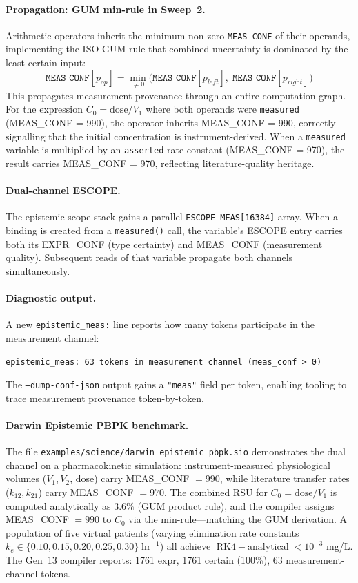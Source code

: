 \documentclass[acmsmall,screen,review,anonymous]{acmart}
\begin{document}
\paragraph{Propagation: GUM min-rule in Sweep~2.}
Arithmetic operators inherit the minimum non-zero \texttt{MEAS\_CONF} of their
operands, implementing the ISO GUM rule that combined uncertainty is dominated
by the least-certain input:
\[
  \texttt{MEAS\_CONF}[p_{\textit{op}}] =
    \min_{\neq 0}\!\bigl(\texttt{MEAS\_CONF}[p_{\textit{left}}],\;
                          \texttt{MEAS\_CONF}[p_{\textit{right}}]\bigr)
\]
This propagates measurement provenance through an entire computation graph.
For the expression $C_0 = \text{dose} / V_1$ where both operands were
\texttt{measured} (MEAS\_CONF = 990), the operator inherits MEAS\_CONF = 990,
correctly signalling that the initial concentration is instrument-derived.
When a \texttt{measured} variable is multiplied by an \texttt{asserted}
rate constant (MEAS\_CONF = 970), the result carries MEAS\_CONF = 970,
reflecting literature-quality heritage.

\paragraph{Dual-channel ESCOPE.}
The epistemic scope stack gains a parallel \texttt{ESCOPE\_MEAS[16384]} array.
When a binding is created from a \texttt{measured()} call, the variable's
ESCOPE entry carries both its EXPR\_CONF (type certainty) and MEAS\_CONF
(measurement quality).
Subsequent reads of that variable propagate both channels simultaneously.

\paragraph{Diagnostic output.}
A new \texttt{epistemic\_meas:} line reports how many tokens participate
in the measurement channel:
\begin{verbatim}
epistemic_meas: 63 tokens in measurement channel (meas_conf > 0)
\end{verbatim}
The \texttt{--dump-conf-json} output gains a \texttt{"meas"} field per token,
enabling tooling to trace measurement provenance token-by-token.

\paragraph{Darwin Epistemic PBPK benchmark.}
The file \texttt{examples/science/darwin\_epistemic\_pbpk.sio} demonstrates
the dual channel on a pharmacokinetic simulation:
instrument-measured physiological volumes ($V_1, V_2$, dose) carry
MEAS\_CONF $= 990$, while literature transfer rates ($k_{12}, k_{21}$) carry
MEAS\_CONF $= 970$.
The combined RSU for $C_0 = \text{dose}/V_1$ is computed analytically as
$3.6\%$ (GUM product rule), and the compiler assigns MEAS\_CONF $= 990$ to
$C_0$ via the min-rule---matching the GUM derivation.
A population of five virtual patients (varying elimination rate constants
$k_e \in \{0.10, 0.15, 0.20, 0.25, 0.30\}\;\text{hr}^{-1}$) all achieve
$|\text{RK4} - \text{analytical}| < 10^{-3}$ mg/L.
The Gen~13 compiler reports: 1761 expr, 1761 certain (100\%), 63 measurement-channel tokens.
\end{document}
